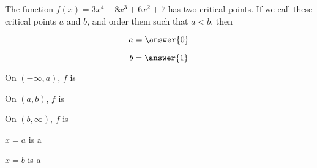 \documentclass[handout]{ximera}
\begin{document}
\begin{exercise}
The function $f(x) = 3x^4-8x^3+6x^2+7$ has two critical points.  If we
call these critical points $a$ and $b$, and order them such that $a <
b $, then

$$
a = \answer{0}
$$

$$
b=\answer{1}
$$



On $(-\infty,a)$, $f$ is 

On $(a,b)$, $f$ is 

On $(b,\infty)$, $f$ is 


$x=a$ is a 

$x=b$ is a 


\end{exercise}
\end{document}
